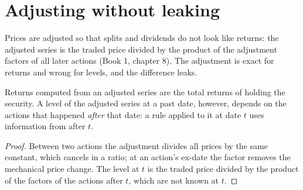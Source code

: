 \begin{omfigure}

\label{fig:rs:universe-symbology-and-corporate-actions:splice}
\end{omfigure}

\section{Adjusting without leaking}

Prices are adjusted so that splits and dividends do not look like returns: the adjusted series is the traded price divided by
the product of the adjustment factors of all later actions (Book 1, chapter 8). The adjustment is exact for returns and wrong for
levels, and the difference leaks.

\begin{proposition}\label{prop:rs:universe-symbology-and-corporate-actions:adjusted}
Returns computed from an adjusted series are the total returns of holding the security. A level of the adjusted series at a
past date, however, depends on the actions that happened \emph{after} that date: a rule applied to it at date $t$ uses information
from after $t$.
\end{proposition}

\begin{proof}
Between two actions the adjustment divides all prices by the same constant, which cancels in a ratio; at an action's ex-date the
factor removes the mechanical price change. The level at $t$ is the traded price divided by the product of the factors of the
actions after $t$, which are not known at $t$.
\end{proof}

